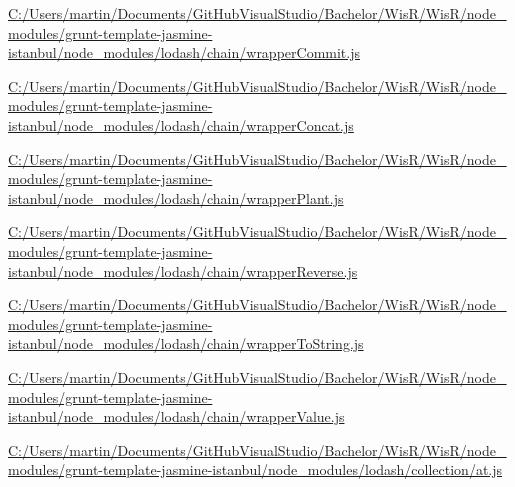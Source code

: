 \begin{DoxyCompactItemize}
\item 
\hyperlink{_c_1_2_users_2martin_2_documents_2_git_hub_visual_studio_2_bachelor_2_wis_r_2_wis_r_2node_module7999586b35221a27818d8ee0050c7edb}{C\+:/\+Users/martin/\+Documents/\+Git\+Hub\+Visual\+Studio/\+Bachelor/\+Wis\+R/\+Wis\+R/node\+\_\+modules/grunt-\/template-\/jasmine-\/istanbul/node\+\_\+modules/lodash/chain/wrapper\+Commit.\+js}
\item 
\hyperlink{_c_1_2_users_2martin_2_documents_2_git_hub_visual_studio_2_bachelor_2_wis_r_2_wis_r_2node_modulef68b0720fe4f447bdb7b367f1da08d65}{C\+:/\+Users/martin/\+Documents/\+Git\+Hub\+Visual\+Studio/\+Bachelor/\+Wis\+R/\+Wis\+R/node\+\_\+modules/grunt-\/template-\/jasmine-\/istanbul/node\+\_\+modules/lodash/chain/wrapper\+Concat.\+js}
\item 
\hyperlink{_c_1_2_users_2martin_2_documents_2_git_hub_visual_studio_2_bachelor_2_wis_r_2_wis_r_2node_module8abc69290b519a3b73d96429fa233ed4}{C\+:/\+Users/martin/\+Documents/\+Git\+Hub\+Visual\+Studio/\+Bachelor/\+Wis\+R/\+Wis\+R/node\+\_\+modules/grunt-\/template-\/jasmine-\/istanbul/node\+\_\+modules/lodash/chain/wrapper\+Plant.\+js}
\item 
\hyperlink{_c_1_2_users_2martin_2_documents_2_git_hub_visual_studio_2_bachelor_2_wis_r_2_wis_r_2node_module02a58a0f537a0e9688a7dc05b7bcd0cd}{C\+:/\+Users/martin/\+Documents/\+Git\+Hub\+Visual\+Studio/\+Bachelor/\+Wis\+R/\+Wis\+R/node\+\_\+modules/grunt-\/template-\/jasmine-\/istanbul/node\+\_\+modules/lodash/chain/wrapper\+Reverse.\+js}
\item 
\hyperlink{_c_1_2_users_2martin_2_documents_2_git_hub_visual_studio_2_bachelor_2_wis_r_2_wis_r_2node_modulef3181bfeb79f584f8a76a020f45ee39e}{C\+:/\+Users/martin/\+Documents/\+Git\+Hub\+Visual\+Studio/\+Bachelor/\+Wis\+R/\+Wis\+R/node\+\_\+modules/grunt-\/template-\/jasmine-\/istanbul/node\+\_\+modules/lodash/chain/wrapper\+To\+String.\+js}
\item 
\hyperlink{_c_1_2_users_2martin_2_documents_2_git_hub_visual_studio_2_bachelor_2_wis_r_2_wis_r_2node_module20958bd8710ad44c9763490860926603}{C\+:/\+Users/martin/\+Documents/\+Git\+Hub\+Visual\+Studio/\+Bachelor/\+Wis\+R/\+Wis\+R/node\+\_\+modules/grunt-\/template-\/jasmine-\/istanbul/node\+\_\+modules/lodash/chain/wrapper\+Value.\+js}
\item 
\hyperlink{_c_1_2_users_2martin_2_documents_2_git_hub_visual_studio_2_bachelor_2_wis_r_2_wis_r_2node_module2597d2cf72857a9b6ac52864d31f4e2d}{C\+:/\+Users/martin/\+Documents/\+Git\+Hub\+Visual\+Studio/\+Bachelor/\+Wis\+R/\+Wis\+R/node\+\_\+modules/grunt-\/template-\/jasmine-\/istanbul/node\+\_\+modules/lodash/collection/at.\+js}

\end{DoxyCompactItemize}
